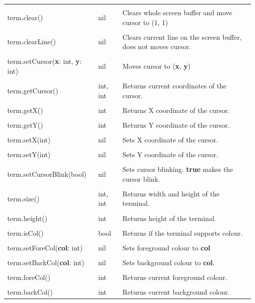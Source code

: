 \documentclass[10pt, stock]{memoir}
\begin{document}
\begin{tabularx}{\textwidth}{l l X}
	\\ \\
	term.clear() & nil & Clears whole screen buffer and move cursor to (1, 1)
	\\ \\
	term.clearLine() & nil & Clears current line on the screen buffer, does not moves cursor.
	\\ \\
	term.setCursor(\textbf{x}: int, \textbf{y}: int) & nil & Moves cursor to (\textbf{x}, \textbf{y})
	\\ \\
	term.getCursor() & int, int & Returns current coordinates of the cursor.
	\\ \\
	term.getX() & int & Returns X coordinate of the cursor.
	\\ \\
	term.getY() & int & Returns Y coordinate of the cursor.
	\\ \\
	term.setX(int) & nil & Sets X coordinate of the cursor.
	\\ \\
	term.setY(int) & nil & Sets Y coordinate of the cursor.
	\\ \\
	term.setCursorBlink(bool) & nil & Sets cursor blinking. \textbf{true} makes the cursor blink.
	\\ \\
	term.size() & int, int & Returns width and height of the terminal.
	\\ \\
	term.height() & int & Returns height of the terminal. 
	\\ \\
	term.isCol() & bool & Returns if the terminal supports colour.
	\\ \\
	term.setForeCol(\textbf{col}: int) & nil & Sets foreground colour to \textbf{col}
	\\ \\
	term.setBackCol(\textbf{col}: int) & nil & Sets background colour to \textbf{col}.
	\\ \\
	term.foreCol() & int & Returns current foreground colour.
	\\ \\
	term.backCol() & int & Returns current background colour.
\end{tabularx}
\end{document}
